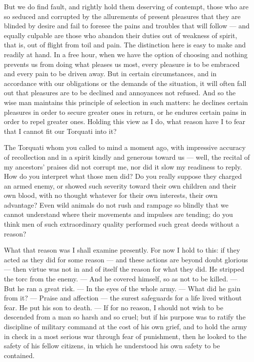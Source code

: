  But we do find fault, and rightly hold them deserving of contempt, those who are so seduced and corrupted by the allurements of present pleasures that they are blinded by desire and fail to foresee the pains and troubles that will follow — and equally culpable are those who abandon their duties out of weakness of spirit, that is, out of flight from toil and pain. The distinction here is easy to make and readily at hand. In a free hour, when we have the option of choosing and nothing prevents us from doing what pleases us most, every pleasure is to be embraced and every pain to be driven away. But in certain circumstances, and in accordance with our obligations or the demands of the situation, it will often fall out that pleasures are to be declined and annoyances not refused. And so the wise man maintains this principle of selection in such matters: he declines certain pleasures in order to secure greater ones in return, or he endures certain pains in order to repel greater ones. Holding this view as I do, what reason have I to fear that I cannot fit our Torquati into it?

 The Torquati whom you called to mind a moment ago, with impressive accuracy of recollection and in a spirit kindly and generous toward us — well, the recital of my ancestors' praises did not corrupt me, nor did it slow my readiness to reply. How do you interpret what those men did? Do you really suppose they charged an armed enemy, or showed such severity toward their own children and their own blood, with no thought whatever for their own interests, their own advantage? Even wild animals do not rush and rampage so blindly that we cannot understand where their movements and impulses are tending; do you think men of such extraordinary quality performed such great deeds without a reason?

 What that reason was I shall examine presently. For now I hold to this: if they acted as they did for some reason — and these actions are beyond doubt glorious — then virtue was not in and of itself the reason for what they did. He stripped the torc from the enemy. — And he covered himself, so as not to be killed. — But he ran a great risk. — In the eyes of the whole army. — What did he gain from it? — Praise and affection — the surest safeguards for a life lived without fear. He put his son to death. — If for no reason, I should not wish to be descended from a man so harsh and so cruel; but if his purpose was to ratify the discipline of military command at the cost of his own grief, and to hold the army in check in a most serious war through fear of punishment, then he looked to the safety of his fellow citizens, in which he understood his own safety to be contained.

